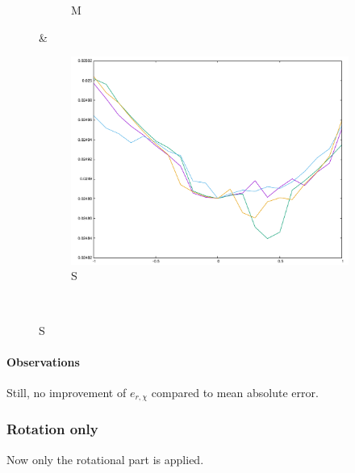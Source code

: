 {\begin{figure}[H]
\begin{subfigure}{.33\textwidth}
	\caption{M}
\end{subfigure}&
\begin{subfigure}{.33\textwidth}
	\includegraphics[width=\linewidth]{fig/ajherr/t3tr/S_mae.pdf}
	\caption{S}
\end{subfigure}\\
\end{figure}

\paragraph{Observations} Still, no improvement of $e_{r,\chi}$ compared to mean absolute error.


\newpage

\subsubsection{Rotation only}
Now only the rotational part is applied.


}
